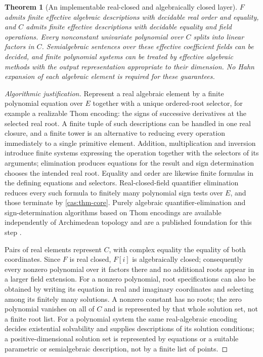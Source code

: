 \documentclass[11pt,letterpaper]{article}
\numberwithin{equation}{section}
\newtheorem{theorem}{Theorem}[section]
\theoremstyle{definition}
\theoremstyle{remark}
\begin{document}
\begin{theorem}[An implementable real-closed and algebraically closed layer]
\label{cas:thm-realclosure}
$F$ admits finite effective algebraic descriptions with decidable real order and
equality, and $C$ admits finite effective descriptions with decidable equality
and field operations. Every nonconstant univariate polynomial over $C$ splits
into linear factors in $C$. Semialgebraic sentences over these effective coefficient
fields can be decided, and finite polynomial systems can be treated by effective
algebraic methods with the output representation appropriate to their dimension.
No Hahn expansion of each algebraic element is required for these guarantees.
\end{theorem}
\begin{proof}[Algorithmic justification]
Represent a real algebraic element by a finite polynomial equation over $E$
together with a unique ordered-root selector, for example a realizable Thom
encoding: the signs of successive derivatives at the selected real root. A
finite tuple of such descriptions can be handled in one real closure, and a
finite tower is an alternative to reducing every operation immediately to a
single primitive element. Addition, multiplication and inversion introduce
finite systems expressing the operation together with the selectors of its
arguments; elimination produces equations for the result and sign determination
chooses the intended real root. Equality and order are likewise finite formulas
in the defining equations and selectors. Real-closed-field quantifier
elimination reduces every such formula to finitely many polynomial sign tests
over $E$, and those terminate by \cref{cas:thm-core}. Purely algebraic
quantifier-elimination and sign-determination algorithms based on Thom encodings
are available independently of Archimedean topology and are a published
foundation for this step \cite{cas:PerrucciRoy}.

Pairs of real elements represent $C$, with complex equality the equality of both
coordinates. Since $F$ is real closed, $F[i]$ is algebraically closed;
consequently every nonzero polynomial over it factors there and no additional
roots appear in a larger field extension. For a nonzero polynomial, root
specifications can also be obtained by writing its equation in real and
imaginary coordinates and selecting among its finitely many solutions. A
nonzero constant has no roots; the zero polynomial vanishes on all of $C$ and
is represented by that whole solution set, not a finite root list. For a polynomial system the same real-algebraic
encoding decides existential solvability and supplies descriptions of its
solution conditions; a positive-dimensional solution set is represented by
equations or a suitable parametric or semialgebraic description, not by a finite
list of points.
\end{proof}
\end{document}
